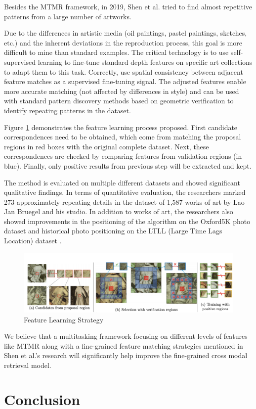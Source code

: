 Besides the MTMR framework, in 2019, Shen et al. \cite{shen2019discovering} tried to find almost repetitive patterns from a large number of artworks. 

Due to the differences in artistic media (oil paintings, pastel paintings, sketches, etc.) and the inherent deviations in the reproduction process, this goal is more difficult to mine than standard examples. The critical technology is to use self-supervised learning to fine-tune standard depth features on specific art collections to adapt them to this task. Correctly, use spatial consistency between adjacent feature matches as a supervised fine-tuning signal. The adjusted features enable more accurate matching (not affected by differences in style) and can be used with standard pattern discovery methods based on geometric verification to identify repeating patterns in the dataset.

Figure \ref{fig:featurelearning} demonstrates the feature learning process proposed. First candidate correspondences need to be obtained, which come from matching the proposal regions in red boxes with the original complete dataset. Next, these correspondences are checked by comparing features from validation regions (in blue). Finally, only positive results from previous step will be extracted and kept. 

The method is evaluated on multiple different datasets and showed significant qualitative findings. In terms of quantitative evaluation, the researchers marked 273 approximately repeating details in the dataset of 1,587 works of art by Lao Jan Bruegel and his studio. In addition to works of art, the researchers also showed improvements in the positioning of the algorithm on the Oxford5K photo dataset \cite{Philbin07} and historical photo positioning on the LTLL (Large Time Lags Location) dataset \cite{Fernando2015CVIU}.

\begin{figure}[h!]
\centering
\includegraphics[width=\textwidth]{featurelearningartwork.pdf}
\caption{Feature Learning Strategy\cite{shen2019discovering}}
\label{fig:featurelearning}
\end{figure}

We believe that a multitasking framework focusing on different levels of features like MTMR \cite{parttowhole} along with a fine-grained feature matching strategies mentioned in Shen et al.'s research \cite{shen2019discovering} will significantly help improve the fine-grained cross modal retrieval model.

\section{Conclusion}


